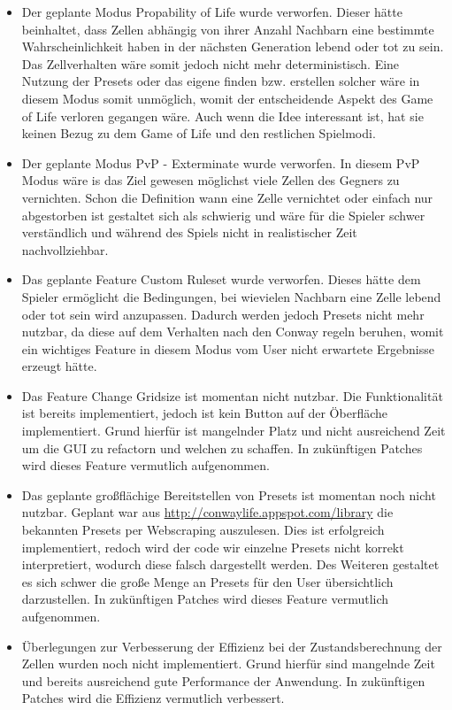 \documentclass[12pt]{article}
\theoremstyle{plain}
\begin{document}
\begin{itemize}
\item
Der geplante Modus Propability of Life wurde verworfen. Dieser hätte beinhaltet, dass Zellen abhängig von ihrer Anzahl Nachbarn eine bestimmte Wahrscheinlichkeit haben in der nächsten Generation lebend oder tot zu sein. Das Zellverhalten wäre somit jedoch nicht mehr deterministisch. Eine Nutzung der Presets oder das eigene finden bzw. erstellen solcher wäre in diesem Modus somit unmöglich, womit der entscheidende Aspekt des Game of Life verloren gegangen wäre. Auch wenn die Idee interessant ist, hat sie keinen Bezug zu dem Game of Life und den restlichen Spielmodi.
\item
Der geplante Modus PvP - Exterminate wurde verworfen. In diesem PvP Modus wäre is das Ziel gewesen möglichst viele Zellen des Gegners zu vernichten. Schon die Definition wann eine Zelle vernichtet oder einfach nur abgestorben ist gestaltet sich als schwierig und wäre für die Spieler schwer verständlich und während des Spiels nicht in realistischer Zeit nachvollziehbar.
\item
Das geplante Feature Custom Ruleset wurde verworfen. Dieses hätte dem Spieler ermöglicht die Bedingungen, bei wievielen Nachbarn eine Zelle lebend oder tot sein wird anzupassen. Dadurch werden jedoch Presets nicht mehr nutzbar, da diese auf dem Verhalten nach den Conway regeln beruhen, womit ein wichtiges Feature in diesem Modus vom User nicht erwartete Ergebnisse erzeugt hätte.
\item
Das Feature Change Gridsize ist momentan nicht nutzbar. Die Funktionalität ist bereits implementiert, jedoch ist kein Button auf der Öberfläche implementiert. Grund hierfür ist mangelnder Platz und nicht ausreichend Zeit um die GUI zu refactorn und welchen zu schaffen. In zukünftigen Patches wird dieses Feature vermutlich aufgenommen.
\item
Das geplante großflächige Bereitstellen von Presets ist momentan noch nicht nutzbar. Geplant war aus \url{http://conwaylife.appspot.com/library} die bekannten Presets per Webscraping auszulesen. Dies ist erfolgreich implementiert, redoch wird der code wir einzelne Presets nicht korrekt interpretiert, wodurch diese falsch dargestellt werden.  Des Weiteren gestaltet es sich schwer die große Menge an Presets für den User übersichtlich darzustellen. In zukünftigen Patches wird dieses Feature vermutlich aufgenommen.
\item
Überlegungen zur Verbesserung der Effizienz bei der Zustandsberechnung der Zellen wurden noch nicht implementiert. Grund hierfür sind mangelnde Zeit und bereits ausreichend gute Performance der Anwendung. In zukünftigen Patches wird die Effizienz vermutlich verbessert.
\end{itemize}
\end{document}
